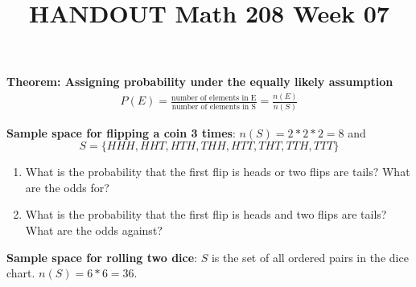 \documentclass[14pt]{extarticle}
\title{\vspace{-5ex}HANDOUT Math 208 Week 07}
\date{\vspace{-10ex}}
\begin{document}
\maketitle		

\begin{tcolorbox}[enhanced jigsaw,colback=bg,boxrule=0pt,arc=0pt] 
	\textbf{Theorem: Assigning probability under the equally likely assumption}
	\begin{align*}
		P(E) = \frac{\text{number of elements in E}}{\text{number of elements in S}} = 
		\frac{n(E)}{n(S)}
	\end{align*}
\end{tcolorbox}

\textbf{Sample space for flipping a coin 3 times}: $n(S)= 2*2*2=8$ and 
$$S=\{HHH, HHT,HTH,THH,HTT,THT,TTH,TTT\}$$

\begin{enumerate}
	\item What is the probability that the first flip is heads or two flips are tails? What are the odds for? \vspace{1.5cm}
	\item What is the probability that the first flip is heads and two flips are tails? What are the odds against?
\end{enumerate}
\vspace{1.5cm}


\textbf{Sample space for rolling two dice}: $S$ is the set of all ordered pairs in the dice chart. $n(S) = 6*6 = 36$.

\end{document}
